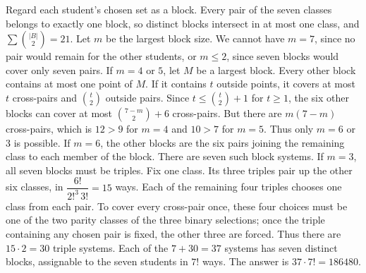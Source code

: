 Regard each student's chosen set as a block. Every pair of the seven classes belongs to exactly one block, so distinct blocks intersect in at most one class, and $\sum\binom{|B|}{2}=21$. Let $m$ be the largest block size. We cannot have $m=7$, since no pair would remain for the other students, or $m\le2$, since seven blocks would cover only seven pairs. If $m=4$ or $5$, let $M$ be a largest block. Every other block contains at most one point of $M$. If it contains $t$ outside points, it covers at most $t$ cross-pairs and $\binom t2$ outside pairs. Since $t\le\binom t2+1$ for $t\ge1$, the six other blocks can cover at most $\binom{7-m}{2}+6$ cross-pairs. But there are $m(7-m)$ cross-pairs, which is $12>9$ for $m=4$ and $10>7$ for $m=5$. Thus only $m=6$ or $3$ is possible. If $m=6$, the other blocks are the six pairs joining the remaining class to each member of the block. There are seven such block systems. If $m=3$, all seven blocks must be triples. Fix one class. Its three triples pair up the other six classes, in $\dfrac{6!}{2!^3\,3!}=15$ ways. Each of the remaining four triples chooses one class from each pair. To cover every cross-pair once, these four choices must be one of the two parity classes of the three binary selections; once the triple containing any chosen pair is fixed, the other three are forced. Thus there are $15\cdot2=30$ triple systems. Each of the $7+30=37$ systems has seven distinct blocks, assignable to the seven students in $7!$ ways. The answer is $37\cdot7!=\boxed{186480}$.
